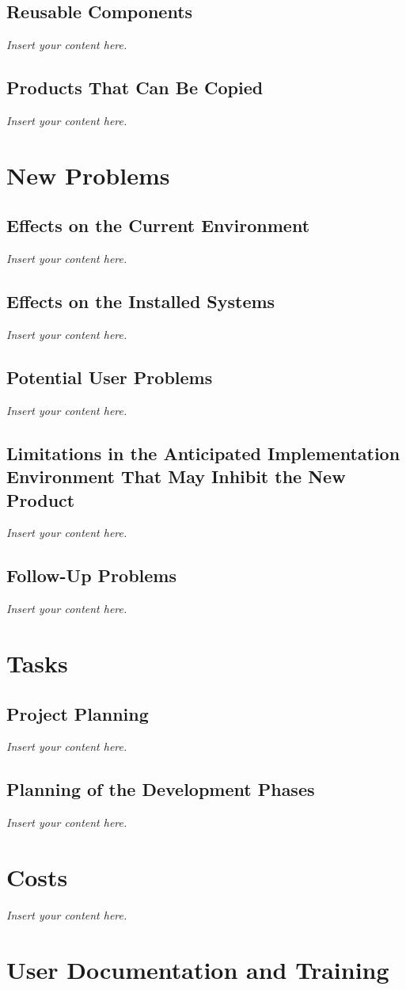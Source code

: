 \documentclass[12pt]{article}
\newcommand{\lips}{\textit{Insert your content here.}}
\begin{document}
\subsection{Reusable Components}
\lips
\subsection{Products That Can Be Copied}
\lips

\section{New Problems}
\subsection{Effects on the Current Environment}
\lips
\subsection{Effects on the Installed Systems}
\lips
\subsection{Potential User Problems}
\lips
\subsection{Limitations in the Anticipated Implementation Environment That May
Inhibit the New Product}
\lips
\subsection{Follow-Up Problems}
\lips

\section{Tasks}
\subsection{Project Planning}
\lips
\subsection{Planning of the Development Phases}
\lips

\section{Costs}
\lips
\section{User Documentation and Training}
\end{document}

